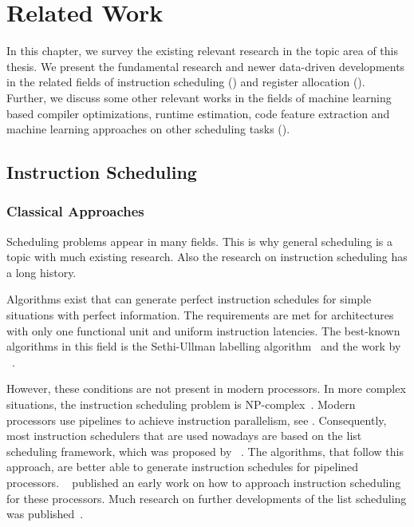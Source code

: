 \chapter{Related Work}
In this chapter, we survey the existing relevant research in the topic area of this thesis. 
We present the fundamental research and newer data-driven developments in the related fields of instruction scheduling () and register allocation ().
Further, we discuss some other relevant works in the fields of machine learning based compiler optimizations, runtime estimation, code feature extraction and machine learning approaches on other scheduling tasks ().

\section{Instruction Scheduling}
\label{sec:rw:instruction-scheduling}
\subsection{Classical Approaches}
Scheduling problems appear in many fields.
This is why general scheduling is a topic with much existing research.
Also the research on instruction scheduling has a long history.

Algorithms exist that can generate perfect instruction schedules for simple situations with perfect information.
The requirements are met for architectures with only one functional unit and uniform instruction latencies.
The best-known algorithms in this field is the Sethi-Ullman labelling algorithm~\cite{sethi1970generation} and the work by \citeauthor{proebsting1991linear}~\cite{proebsting1991linear}.

However, these conditions are not present in modern processors.
In more complex situations, the instruction scheduling problem is NP-complex~\cite{hennessy1983postpass}.
Modern processors use pipelines to achieve instruction parallelism, see .
Consequently, most instruction schedulers that are used nowadays are based on the list scheduling framework, which was proposed by \citeauthor{landskov1980local}~\cite{landskov1980local}.
The algorithms, that follow this approach, are better able to generate instruction schedules for pipelined processors.
\citeauthor{heller1961sequencing}~\cite{heller1961sequencing} published an early work on how to approach instruction scheduling for these processors.
Much research on further developments of the list scheduling was published~\cite{bernstein1991global,gibbons1986efficient,hennessy1983postpass}.

